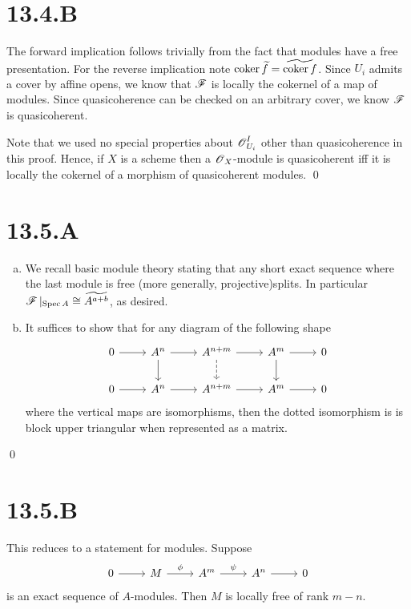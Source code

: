 \documentclass{article}
\begin{document}
\section*{13.4.B}
The forward implication follows trivially from the fact that modules have a
free presentation. For the reverse implication note $\operatorname{coker} \widetilde{f}=\widetilde{\operatorname{coker} f}$.
Since $U_i$ admits a cover by affine opens, we know that
$\operatorname{\mathscr{F}}$ is locally the cokernel of a map of modules. Since
quasicoherence can be checked on an arbitrary cover, we know
$\operatorname{\mathscr{F}}$ is quasicoherent.

Note that we used no special properties about $\operatorname{\mathscr{O}}_{U_i}^I$ other
than quasicoherence in this proof. Hence, if $X$ is a
scheme then a $\operatorname{\mathscr{O}}_X$-module is quasicoherent iff it is locally
the cokernel of a morphism of quasicoherent modules. \qed

\section*{13.5.A}
\begin{enumerate}[a.]
    \item We recall basic module theory stating that any short exact sequence where the
          last module is free (more generally, projective)splits. In particular
          $\operatorname{\mathscr{F}}|_{\operatorname{Spec} A}\cong\widetilde{A^{a+b}}$, as desired.
    \item It suffices to show that for any diagram of the following shape
          \[\begin{tikzcd}
                  0 & {A^n} & {A^{n+m}} & {A^m} & 0 \\
                  0 & {A^n} & {A^{n+m}} & {A^m} & 0
                  \arrow[from=1-1, to=1-2]
                  \arrow[from=1-2, to=1-3]
                  \arrow[from=1-3, to=1-4]
                  \arrow[from=1-4, to=1-5]
                  \arrow[from=2-1, to=2-2]
                  \arrow[from=2-2, to=2-3]
                  \arrow[from=2-3, to=2-4]
                  \arrow[from=2-4, to=2-5]
                  \arrow[from=1-2, to=2-2]
                  \arrow[from=1-4, to=2-4]
                  \arrow[dashed, from=1-3, to=2-3]
              \end{tikzcd}\] where the vertical maps are isomorphisms, then the
          dotted isomorphism is is block upper triangular when represented as a matrix.
\end{enumerate}
\qed

\section*{13.5.B}
This reduces to a statement for modules. Suppose  \[\begin{tikzcd}
        0 & M & {A^m} & {A^n} & 0
        \arrow[from=1-4, to=1-5]
        \arrow["\psi", from=1-3, to=1-4]
        \arrow["\phi", from=1-2, to=1-3]
        \arrow[from=1-1, to=1-2]
    \end{tikzcd}\] is an
exact sequence of $A$-modules. Then $M$
is locally free of rank $m-n$.
\end{document}
